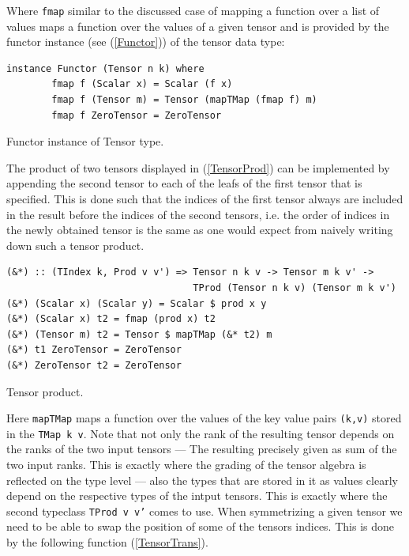 \documentclass[a4paper,12pt, DIV=14, BCOR=5mm, twoside, headsepline, numbers=noenddot]{scrbook}
\begin{document}
Where \texttt{fmap} similar to the discussed case of mapping a function over a list of values maps a function over the values of a given tensor and is provided by the functor instance (see (\ref{Functor})) of the tensor data type:

\begin{listing}[hbt!] 
\begin{verbatim}
instance Functor (Tensor n k) where 
        fmap f (Scalar x) = Scalar (f x)
        fmap f (Tensor m) = Tensor (mapTMap (fmap f) m)
        fmap f ZeroTensor = ZeroTensor 
\end{verbatim}
\caption{Functor instance of Tensor type.}\label{Functor}
\end{listing}

The product of two tensors displayed in (\ref{TensorProd}) can be implemented by appending the second tensor to each of the leafs of the first tensor that is specified. This is done such that the indices of the first tensor always are included in the result before the indices of the second tensors, i.e. the order of indices in the newly obtained tensor is the same as one would expect from naively writing down such a tensor product.

\begin{listing}[hbt!]
\begin{verbatim}
(&*) :: (TIndex k, Prod v v') => Tensor n k v -> Tensor m k v' ->
                                 TProd (Tensor n k v) (Tensor m k v')
(&*) (Scalar x) (Scalar y) = Scalar $ prod x y
(&*) (Scalar x) t2 = fmap (prod x) t2
(&*) (Tensor m) t2 = Tensor $ mapTMap (&* t2) m
(&*) t1 ZeroTensor = ZeroTensor
(&*) ZeroTensor t2 = ZeroTensor
\end{verbatim}
\caption{Tensor product.}\label{TensorProd}
\end{listing}

Here \texttt{mapTMap} maps a function over the values of the key value pairs \texttt{(k,v)} stored in the \texttt{TMap k v}.
Note that not only the rank of the resulting tensor depends on the ranks of the two input tensors --- The resulting precisely given as sum of the two input ranks. This is exactly where the grading of the tensor algebra is reflected on the type level --- also the types that are stored in it as values clearly depend on the respective types of the intput tensors. This is exactly where the second typeclass \texttt{TProd v v'} comes to use. 
When symmetrizing a given tensor we need to be able to swap the position of some of the tensors indices. This is done by the following function (\ref{TensorTrans}).
\end{document}
